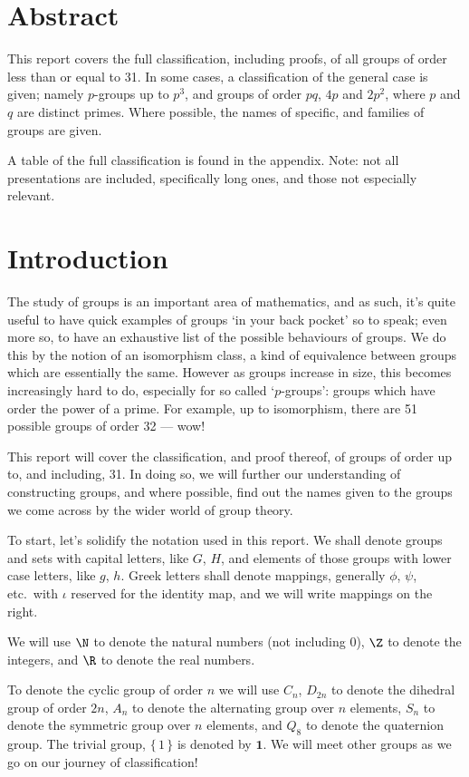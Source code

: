 \section{Abstract}
This report covers the full classification, including proofs, of all groups of order less than or equal to 31.
In some cases, a classification of the general case is given; namely \(p\)-groups up to \(p^3\), and groups of
order \(pq\), \(4p\) and \(2p^2\), where \(p\) and \(q\) are distinct primes.
Where possible, the names of specific, and families of groups are given.

A table of the full classification is found in the appendix.
Note: not all presentations are included, specifically long ones, and those not especially relevant.

\section{Introduction}
The study of groups is an important area of mathematics, and as such, it's quite useful to have quick examples of groups
`in your back pocket' so to speak; even more so, to have an exhaustive list of the possible behaviours of groups.
We do this by the notion of an isomorphism class, a kind of equivalence between groups which are essentially the same.
However as groups increase in size, this becomes increasingly hard to do, especially for so called `\(p\)-groups':
groups which have order the power of a prime.
For example, up to isomorphism, there are 51 possible groups of order 32 --- wow!

This report will cover the classification, and proof thereof, of groups of order up to, and including, 31.
In doing so, we will further our understanding of constructing groups, and where possible, find out the names given to
the groups we come across by the wider world of group theory.

To start, let's solidify the notation used in this report.
We shall denote groups and sets with capital letters, like \(G\), \(H\), and elements of those groups with lower case
letters, like \(g\), \(h\).
Greek letters shall denote mappings, generally \(\phi\), \(\psi\), etc.\ with \(\iota\) reserved for the identity map,
and we will write mappings on the right.

We will use \(\N\) to denote the natural numbers (not including 0), \(\Z\) to denote the integers, and \(\R\) to denote
the real numbers.

To denote the cyclic group of order \(n\) we will use \(C_n\), \(D_{2n}\) to denote the dihedral group of order \(2n\),
\(A_n\) to denote the alternating group over \(n\) elements, \(S_n\) to denote the symmetric group over \(n\)
elements, and \(Q_8\) to denote the quaternion group.
The trivial group, \(\{\, 1\, \}\) is denoted by \(\bm{1}\).
We will meet other groups as we go on our journey of classification!

